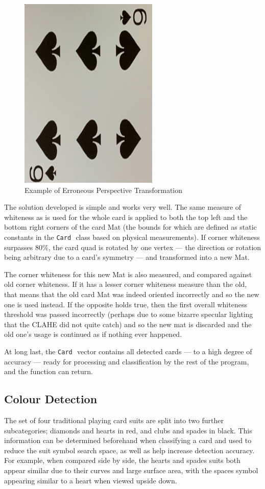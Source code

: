 \documentclass[a4paper,12pt,notitlepage]{article}
\newcommand{\code}[1]{\colorbox{white}{\lstinline[basicstyle=\ttfamily\color{black}]|#1|} }
\begin{document}
\begin{figure}[H]
				\includegraphics[width=0.3\linewidth]{rot4}
				\caption{Example of Erroneous Perspective Transformation}
				\label{fig:rot}
			\end{figure}

			The solution developed is simple and works very well. The same measure of whiteness as is used for the whole card is applied to both the top left and the bottom right corners of the card Mat (the bounds for which are defined as static constants in the \code{Card} class based on physical measurements). If corner whiteness surpasses 80\%, the card quad is rotated by one vertex --- the direction or rotation being arbitrary due to a card's symmetry --- and transformed into a new Mat.

			The corner whiteness for this new Mat is also measured, and compared against old corner whiteness. If it has a lesser corner whiteness measure than the old, that means that the old card Mat was indeed oriented incorrectly and so the new one is used instead. If the opposite holds true, then the first overall whiteness threshold was passed incorrectly (perhaps due to some bizarre specular lighting that the CLAHE did not quite catch) and so the new mat is discarded and the old one's usage is continued as if nothing ever happened.

			At long last, the \code{Card} vector contains all detected cards --- to a high degree of accuracy --- ready for processing and classification by the rest of the program, and the function can return.

	\subsection{Colour Detection}
		The set of four traditional playing card suits are split into two further subcategories; diamonds and hearts in red, and clubs and spades in black. This information can be determined beforehand when classifying a card and used to reduce the suit symbol search space, as well as help increase detection accuracy. For example, when compared side by side, the hearts and spades suits both appear similar due to their curves and large surface area, with the spaces symbol appearing similar to a heart when viewed upside down.
\end{document}
